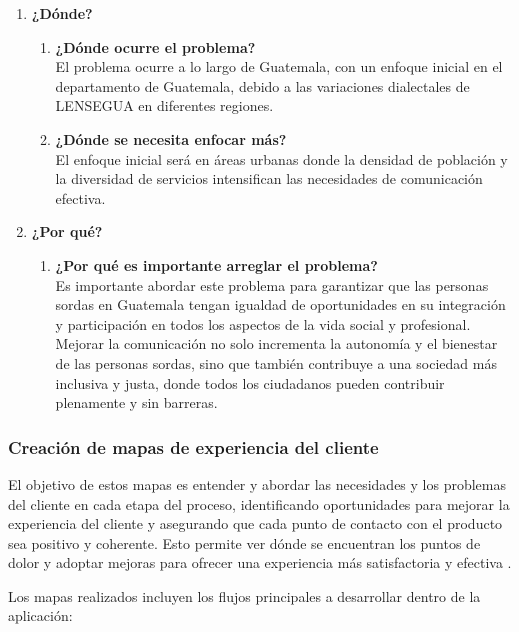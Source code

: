 \begin{enumerate}
    \item \textbf{¿Dónde?}
    \begin{enumerate}
        \item \textbf{¿Dónde ocurre el problema?} \\
        El problema ocurre a lo largo de Guatemala, con un enfoque inicial en el departamento de Guatemala, debido a las variaciones dialectales de LENSEGUA en diferentes regiones.
        \item \textbf{¿Dónde se necesita enfocar más?} \\
        El enfoque inicial será en áreas urbanas donde la densidad de población y la diversidad de servicios intensifican las necesidades de comunicación efectiva.
    \end{enumerate}

    \item \textbf{¿Por qué?}
    \begin{enumerate}
        \item \textbf{¿Por qué es importante arreglar el problema?} \\
        Es importante abordar este problema para garantizar que las personas sordas en Guatemala tengan igualdad de oportunidades en su integración y participación en todos los aspectos de la vida social y profesional. Mejorar la comunicación no solo incrementa la autonomía y el bienestar de las personas sordas, sino que también contribuye a una sociedad más inclusiva y justa, donde todos los ciudadanos pueden contribuir plenamente y sin barreras.
    \end{enumerate}
\end{enumerate}


\subsubsection{Creación de mapas de experiencia del cliente}

El objetivo de estos mapas es entender y abordar las necesidades y los problemas del cliente en cada etapa del proceso, identificando oportunidades para mejorar la experiencia del cliente y asegurando que cada punto de contacto con el producto sea positivo y coherente. Esto permite ver dónde se encuentran los puntos de dolor y adoptar mejoras para ofrecer una experiencia más satisfactoria y efectiva \cite{Hamond2024}.

Los mapas realizados incluyen los flujos principales a desarrollar dentro de la aplicación: 



